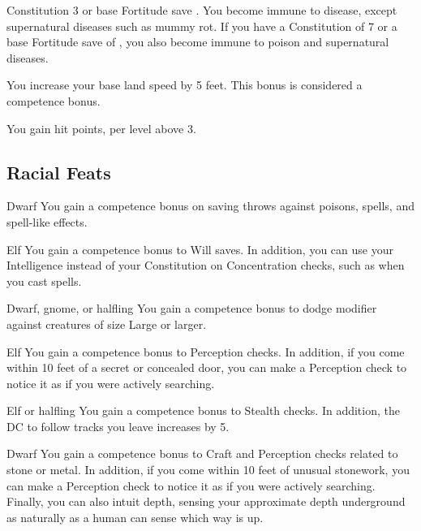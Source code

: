 \featpre Constitution 3 or base Fortitude save .
\featben You become immune to disease, except supernatural diseases such as mummy rot. If you have a Constitution of 7 or a base Fortitude save of , you also become immune to poison and supernatural diseases.


 You increase your base land speed by 5 feet. This bonus is considered a competence bonus.

 You gain  hit points,  per level above 3.

\subsection{Racial Feats}

 Dwarf
 You gain a  competence bonus on saving throws against poisons, spells, and spell-like effects.

 Elf
 You gain a  competence bonus to Will saves. In addition, you can use your Intelligence instead of your Constitution on Concentration checks, such as when you cast spells.

 Dwarf, gnome, or halfling
 You gain a  competence bonus to dodge modifier against creatures of size Large or larger.

 Elf
 You gain a  competence bonus to Perception checks. In addition, if you come within 10 feet of a secret or concealed door, you can make a Perception check to notice it as if you were actively searching.

 Elf or halfling
 You gain a  competence bonus to Stealth checks. In addition, the DC to follow tracks you leave increases by 5.

 Dwarf
 You gain a  competence bonus to Craft and Perception checks related to stone or metal. In addition, if you come within 10 feet of unusual stonework, you can make a Perception check to notice it as if you were actively searching. Finally, you can also intuit depth, sensing your approximate depth underground as naturally as a human can sense which way is up.

